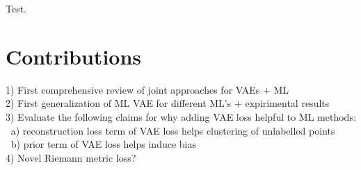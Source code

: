 \documentclass[./dissertation.tex]{subfiles}
\begin{document}
    
    Test.
    \section{Contributions}
        1) First comprehensive review of joint approaches for VAEs + ML \\
        2) First generalization of ML VAE for different ML's + expirimental results \\
        3) Evaluate the following claims for why adding VAE loss helpful to ML methods: \\
        $\>$ a) reconstruction loss term of VAE loss helps clustering of unlabelled points \\
        $\>$ b) prior term of VAE loss helps induce bias \\
        4) Novel Riemann metric loss? 
\end{document}
